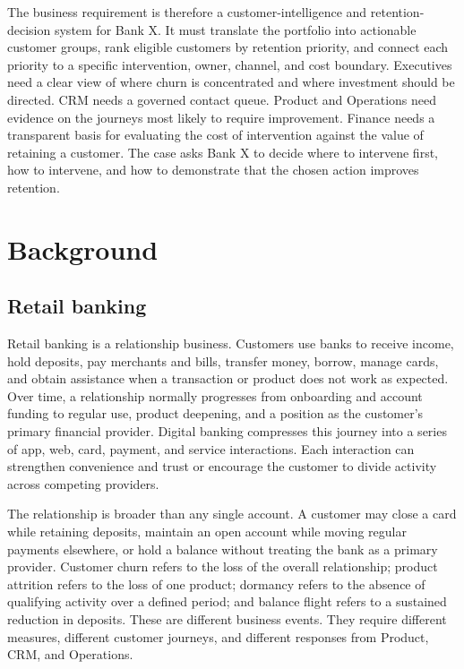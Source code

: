\documentclass[a4paper,12pt]{article}
\begin{document}
The business requirement is therefore a customer-intelligence and retention-decision system for Bank X. It must translate the portfolio into actionable customer groups, rank eligible customers by retention priority, and connect each priority to a specific intervention, owner, channel, and cost boundary. Executives need a clear view of where churn is concentrated and where investment should be directed. CRM needs a governed contact queue. Product and Operations need evidence on the journeys most likely to require improvement. Finance needs a transparent basis for evaluating the cost of intervention against the value of retaining a customer. The case asks Bank X to decide where to intervene first, how to intervene, and how to demonstrate that the chosen action improves retention.

\section{Background}

\subsection{Retail banking}

Retail banking is a relationship business. Customers use banks to receive income, hold deposits, pay merchants and bills, transfer money, borrow, manage cards, and obtain assistance when a transaction or product does not work as expected. Over time, a relationship normally progresses from onboarding and account funding to regular use, product deepening, and a position as the customer's primary financial provider. Digital banking compresses this journey into a series of app, web, card, payment, and service interactions. Each interaction can strengthen convenience and trust or encourage the customer to divide activity across competing providers.

The relationship is broader than any single account. A customer may close a card while retaining deposits, maintain an open account while moving regular payments elsewhere, or hold a balance without treating the bank as a primary provider. Customer churn refers to the loss of the overall relationship; product attrition refers to the loss of one product; dormancy refers to the absence of qualifying activity over a defined period; and balance flight refers to a sustained reduction in deposits. These are different business events. They require different measures, different customer journeys, and different responses from Product, CRM, and Operations.
\end{document}
